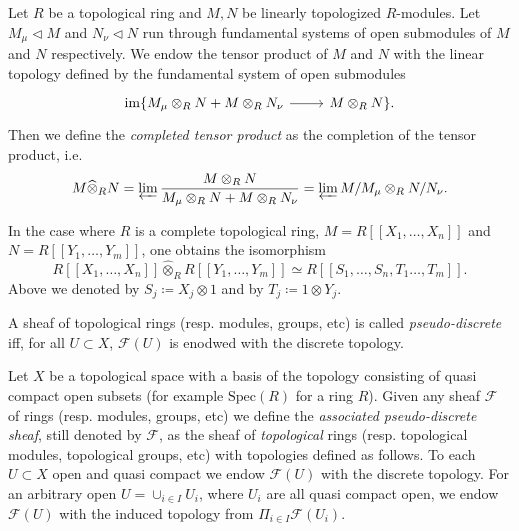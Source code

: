 \documentclass[../Main]{subfiles}
\begin{document}
\begin{defn}
	Let $R$ be a topological ring and $M, N$ be linearly topologized $R$-modules.
	Let $M_\mu \triangleleft M$ and $N_\nu \triangleleft N$ run through
	fundamental systems of open submodules of $M$ and $N$ respectively.
	We endow the tensor product of $M$ and $N$ with the linear topology
	defined by the fundamental system of open submodules
	\begin{equation*}
	\begin{tikzcd}
	\ima \{ M_\mu \otimes_R N + M \otimes_R N_\nu 
		\arrow[r, "", rightarrow] &
	M \otimes_R N \}
	.\end{tikzcd}
	\end{equation*}
	Then we define the {\em completed tensor product} as the completion
	of the tensor product, i.e.
	\begin{equation*}
		M \widehat{\otimes}_R N = 
		\varprojlim \frac{M \otimes_R N}{M_\mu \otimes_R N +
		M \otimes_R N_\nu} =
		\varprojlim M / M_\mu \otimes_R N / N_\nu
	.\end{equation*}
\end{defn}


\begin{rem}[]
	In the case where $R$ is a complete topological ring,
	$M = R [\![ X_1, \ldots, X_{ n } ]\!]$
	and $N = R [\![ Y_1, \ldots, Y_{ m } ]\!]$,
	one obtains the isomorphism
	\begin{equation*}
		R [\![ X_1, \ldots, X_{ n } ]\!] \widehat{\otimes}_R
		R [\![ Y_1, \ldots, Y_{ m } ]\!] \simeq
		R [\![ S_1, \ldots, S_n, T_1 \ldots, T_{ m } ]\!]
	.\end{equation*}
	Above we denoted by $S_j \coloneqq X_j \otimes 1$
	and by $T_j \coloneqq 1 \otimes Y_j$.
\end{rem}


\begin{defn}
	A sheaf of topological rings (resp$.$ modules, groups, etc)
	is called {\em pseudo-discrete} iff, for all $U \subset X$,
	$\mathcal{F}(U)$ is enodwed with the discrete topology.
\end{defn}


\begin{defn}\label{defn:AssociatePDSheaf}
	Let $X$ be a topological space with a basis of the topology
	consisting of quasi compact open subsets (for example $\mathrm{Spec}(R)$
	for a ring $R$).
	Given any sheaf $\mathcal{F}$ of rings (resp$.$ modules, groups, etc)
	we define the {\em associated pseudo-discrete sheaf},
	still denoted by $\mathcal{F}$, as the sheaf
	of {\em topological} rings (resp$.$ topological modules, topological groups, etc)
	with topologies defined as follows.
	To each $U \subset X$ open and quasi compact we endow
	$\mathcal{F}(U)$ with the discrete topology.
	For an arbitrary open $U = \cup_{i \in I} U_i$, where $U_i$ are all
	quasi compact open, we endow $\mathcal{F}(U)$ with the
	induced topology from $\Pi_{i \in I} \mathcal{F}(U_i)$.
\end{defn}
\end{document}
